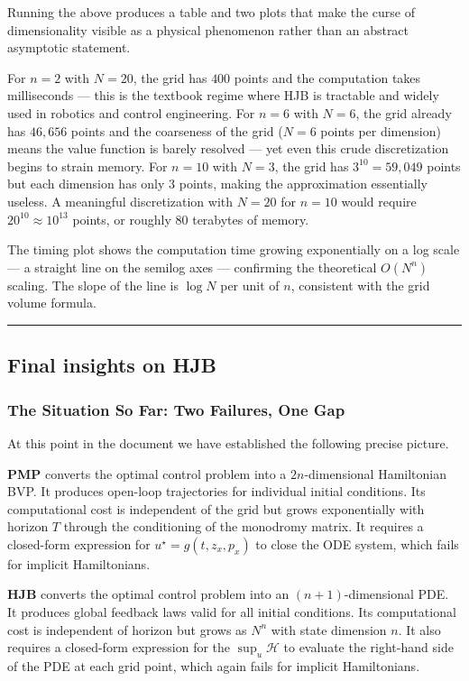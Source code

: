 \documentclass{article}
\begin{document}
\begin{compnumissuesbox}
Running the above produces a table and two plots that make the curse of dimensionality visible as a physical phenomenon rather than an abstract asymptotic statement.

For $n = 2$ with $N = 20$, the grid has $400$ points and the computation takes milliseconds --- this is the textbook regime where HJB is tractable and widely used in robotics and control engineering. For $n = 6$ with $N = 6$, the grid already has $46{,}656$ points and the coarseness of the grid ($N=6$ points per dimension) means the value function is barely resolved --- yet even this crude discretization begins to strain memory. For $n = 10$ with $N = 3$, the grid has $3^{10} = 59{,}049$ points but each dimension has only 3 points, making the approximation essentially useless. A meaningful discretization with $N = 20$ for $n = 10$ would require $20^{10} \approx 10^{13}$ points, or roughly 80 terabytes of memory.

The timing plot shows the computation time growing exponentially on a log scale --- a straight line on the semilog axes --- confirming the theoretical $O(N^n)$ scaling. The slope of the line is $\log N$ per unit of $n$, consistent with the grid volume formula.
\end{compnumissuesbox}

\medskip\hrule\medskip

\subsection{Final insights on HJB}
\label{sec:HJB-final-insights}

\subsubsection{The Situation So Far: Two Failures, One Gap}

At this point in the document we have established the following precise picture.

\textbf{PMP} converts the optimal control problem into a $2n$-dimensional Hamiltonian BVP. It produces open-loop trajectories for individual initial conditions. Its computational cost is independent of the grid but grows exponentially with horizon $T$ through the conditioning of the monodromy matrix. It requires a closed-form expression for $u^\star = g(t, z_x, p_x)$ to close the ODE system, which fails for implicit Hamiltonians.

\textbf{HJB} converts the optimal control problem into an $(n+1)$-dimensional PDE. It produces global feedback laws valid for all initial conditions. Its computational cost is independent of horizon but grows as $N^n$ with state dimension $n$. It also requires a closed-form expression for the $\sup_u \mathcal{H}$ to evaluate the right-hand side of the PDE at each grid point, which again fails for implicit Hamiltonians.
\end{document}
